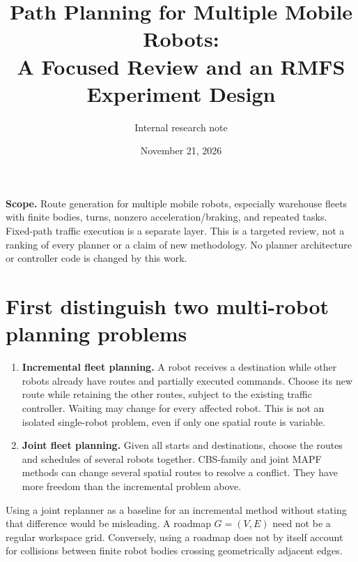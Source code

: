 \documentclass[11pt,a4paper]{article}
\title{Path Planning for Multiple Mobile Robots:\\A Focused Review and an RMFS Experiment Design}
\author{Internal research note}
\date{November 21, 2026}
\begin{document}
\maketitle
\noindent\textbf{Scope.} Route generation for multiple mobile robots, especially
warehouse fleets with finite bodies, turns, nonzero acceleration/braking, and
repeated tasks. Fixed-path traffic execution is a separate layer. This is a
targeted review, not a ranking of every planner or a claim of new methodology.
No planner architecture or controller code is changed by this work.

\section{First distinguish two multi-robot planning problems}
\begin{enumerate}
\item \textbf{Incremental fleet planning.} A robot receives a destination while
other robots already have routes and partially executed commands. Choose its
new route while retaining the other routes, subject to the existing traffic
controller. Waiting may change for every affected robot. This is not an isolated
single-robot problem, even if only one spatial route is variable.
\item \textbf{Joint fleet planning.} Given all starts and destinations, choose
the routes and schedules of several robots together. CBS-family and joint MAPF
methods can change several spatial routes to resolve a conflict. They have
more freedom than the incremental problem above.
\end{enumerate}
Using a joint replanner as a baseline for an incremental method without stating
that difference would be misleading. A roadmap $G=(V,E)$ need not be a regular
workspace grid. Conversely, using a roadmap does not by itself account for
collisions between finite robot bodies crossing geometrically adjacent edges.

\begin{center}
\end{center}
\end{document}
